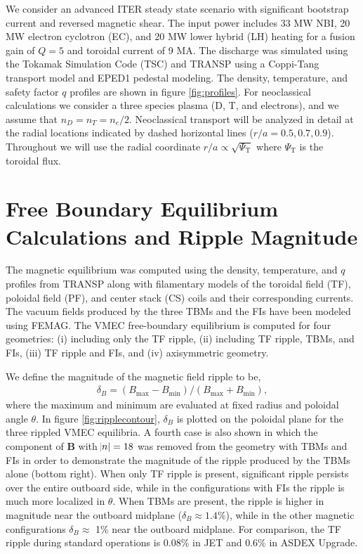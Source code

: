 \documentclass[aip, pop, preprint]{revtex4-1}
\numberwithin{figure}{section}
\numberwithin{equation}{section}
\begin{document}
We consider an advanced ITER steady state scenario with significant bootstrap current and reversed magnetic shear.\cite{Poli2014} The input power includes 33 MW NBI, 20 MW electron cyclotron (EC), and 20 MW lower hybrid (LH) heating for a fusion gain of $Q = 5$ and toroidal current of 9 MA. The discharge was simulated using the Tokamak Simulation Code (TSC) \cite{Jardin1986} and TRANSP \cite{Hawryluk1980} using a Coppi-Tang \cite{Jardin1993} transport model and EPED1 \cite{Snyder2011} pedestal modeling. The density, temperature, and safety factor $q$ profiles are shown in figure \ref{fig:profiles}. For neoclassical calculations we consider a three species plasma (D, T, and electrons), and we assume that $n_D = n_T = n_e/2$. Neoclassical transport will be analyzed in detail at the radial locations indicated by dashed horizontal lines ($r/a = 0.5, 0.7, 0.9$). Throughout we will use the radial coordinate $r/a \propto \sqrt{\Psi_{\text{T}}}$ where $\Psi_{\text{T}}$ is the toroidal flux.

\FloatBarrier

\section{Free Boundary Equilibrium Calculations and Ripple Magnitude} \label{vmec}

The magnetic equilibrium was computed using the density, temperature, and $q$ profiles from TRANSP along with filamentary models of the toroidal field (TF), poloidal field (PF), and center stack (CS) coils and their corresponding currents. The vacuum fields produced by the three TBMs and the FIs have been modeled using FEMAG.\cite{Shinohara2009} The VMEC free-boundary equilibrium \cite{Hirshman1986a} is computed for four geometries: (i) including only the TF ripple, (ii) including TF ripple, TBMs, and FIs, (iii) TF ripple and FIs, and (iv) axisymmetric geometry.  

We define the magnitude of the magnetic field ripple to be,
\begin{gather}
\delta_B = (B_{\text{max}}-B_{\text{min}})/(B_{\text{max}} + B_{\text{min}}), 
\end{gather}
where the maximum and minimum are evaluated at fixed radius and poloidal angle $\theta$. In figure \ref{fig:ripplecontour}, $\delta_B$ is plotted on the poloidal plane for the three rippled VMEC equilibria. A fourth case is also shown in which the component of $\bm{B}$ with $\abs{n} = 18$ was removed from the geometry with TBMs and FIs in order to demonstrate the magnitude of the ripple produced by the TBMs alone (bottom right). When only TF ripple is present, significant ripple persists over the entire outboard side, while in the configurations with FIs the ripple is much more localized in $\theta$. When TBMs are present, the ripple is higher in magnitude near the outboard midplane ($\delta_B \approx 1.4\%$), while in the other magnetic configurations $\delta_B \approx$ 1\% near the outboard midplane. For comparison, the TF ripple during standard operations is $0.08\%$ in JET \cite{DeVries2008b} and $0.6\%$ in ASDEX Upgrade.\cite{Martitsch2016} 
\end{document}
